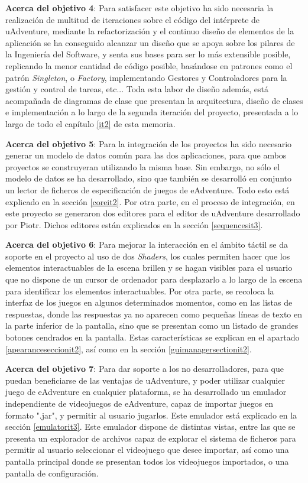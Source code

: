 \textbf{Acerca del objetivo 4}: Para satisfacer este objetivo ha sido necesaria la realización de multitud de iteraciones sobre el código del intérprete de uAdventure, mediante la refactorización y el continuo diseño de elementos de la aplicación se ha conseguido alcanzar un diseño que se apoya sobre los pilares de la Ingeniería del Software, y senta sus bases para ser lo más extensible posible, replicando la menor cantidad de código posible, basándose en patrones como el patrón \textit{Singleton}, o \textit{Factory}, implementando Gestores y Controladores para la gestión y control de tareas, etc... Toda esta labor de diseño además, está acompañada de diagramas de clase que presentan la arquitectura, diseño de clases e implementación a lo largo de la segunda iteración del proyecto, presentada a lo largo de todo el capítulo \ref{it2} de esta memoria.

\textbf{Acerca del objetivo 5}: Para la integración de los proyectos ha sido necesario generar un modelo de datos común para las dos aplicaciones, para que ambos proyectos se construyeran utilizando la misma base. Sin embargo, no sólo el modelo de datos se ha desarrollado, sino que también se desarrolló en conjunto un lector de ficheros de especificación de juegos de eAdventure. Todo esto está explicado en la sección \ref{coreit2}. Por otra parte, en el proceso de integración, en este proyecto se generaron dos editores para el editor de uAdventure desarrollado por Piotr. Dichos editores están explicados en la sección \ref{sequencesit3}.

\textbf{Acerca del objetivo 6}: Para mejorar la interacción en el ámbito táctil se da soporte en el proyecto al uso de dos \textit{Shaders}, los cuales permiten hacer que los elementos interactuables de la escena brillen y se hagan visibles para el usuario que no dispone de un cursor de ordenador para desplazarlo a lo largo de la escena para identificar los elementos interactuables. Por otra parte, se recoloca la interfaz de los juegos en algunos determinados momentos, como en las listas de respuestas, donde las respuestas ya no aparecen como pequeñas líneas de texto en la parte inferior de la pantalla, sino que se presentan como un listado de grandes botones cendrados en la pantalla. Estas características se explican en el apartado \ref{apearanceseccionit2}, así como en la sección \ref{guimanagersectionit2}.

\textbf{Acerca del objetivo 7}: Para dar soporte a los no desarrolladores, para que puedan beneficiarse de las ventajas de uAdventure, y poder utilizar cualquier juego de eAdventure en cualquier plataforma, se ha desarrollado un emulador independiente de videojuegos de eAdventure, capaz de importar juegos en formato ".jar", y permitir al usuario jugarlos. Este emulador está explicado en la sección \ref{emulatorit3}. Este emulador dispone de distintas vistas, entre las que se presenta un explorador de archivos capaz de explorar el sistema de ficheros para permitir al usuario seleccionar el videojuego que desee importar, así como una pantalla principal donde se presentan todos los videojuegos importados, o una pantalla de configuración.

